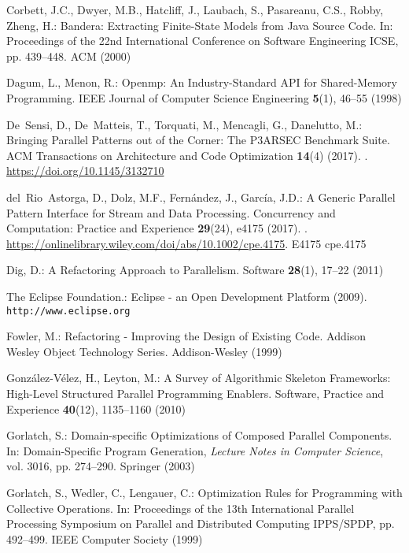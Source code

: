 \documentclass[smallextended]{svjour3}
\begin{document}
\begin{thebibliography}{10}
Corbett, J.C., Dwyer, M.B., Hatcliff, J., Laubach, S., Pasareanu, C.S., Robby,
  Zheng, H.: Bandera: Extracting Finite-State Models from Java Source Code.
\newblock In: {Proceedings of the 22nd International Conference on Software Engineering ICSE}, pp. 439--448. {ACM} (2000)

Dagum, L., Menon, R.: Openmp: An Industry-Standard API for Shared-Memory
  Programming.
\newblock IEEE Journal of Computer Science Engineering \textbf{5}(1), 46–55 (1998)

De~Sensi, D., De~Matteis, T., Torquati, M., Mencagli, G., Danelutto, M.:
  Bringing Parallel Patterns out of the Corner: The P3ARSEC Benchmark Suite.
\newblock ACM Transactions on Architecture and Code Optimization \textbf{14}(4) (2017).
\newblock {}.
\newblock \urlprefix\url{https://doi.org/10.1145/3132710}

del Rio Astorga, D., Dolz, M.F., Fernández, J., García, J.D.: A Generic
  Parallel Pattern Interface for Stream and Data Processing.
\newblock Concurrency and Computation: Practice and Experience \textbf{29}(24),
  e4175 (2017).
\newblock {}.
\newblock
  \urlprefix\url{https://onlinelibrary.wiley.com/doi/abs/10.1002/cpe.4175}.
\newblock E4175 cpe.4175

Dig, D.: A Refactoring Approach to Parallelism.
 Software \textbf{28}(1), 17--22 (2011)

The Eclipse Foundation.: {E}clipse - an {O}pen {D}evelopment {P}latform (2009).
\newblock \texttt{http://www.eclipse.org}

Fowler, M.: Refactoring - Improving the Design of Existing Code.
\newblock Addison Wesley Object Technology Series. Addison-Wesley (1999)

Gonz{\'{a}}lez{-}V{\'{e}}lez, H., Leyton, M.: A Survey of Algorithmic Skeleton
  Frameworks: High-Level Structured Parallel Programming Enablers.
\newblock Software, Practice and Experience \textbf{40}(12), 1135--1160 (2010)

Gorlatch, S.: Domain-specific Optimizations of Composed Parallel Components.
\newblock In: Domain-Specific Program Generation, \emph{Lecture Notes in
  Computer Science}, vol. 3016, pp. 274--290. Springer (2003)

Gorlatch, S., Wedler, C., Lengauer, C.: Optimization Rules for Programming with
  Collective Operations.
\newblock In: {Proceedings of the 13th International Parallel Processing Symposium on Parallel and Distributed Computing IPPS/SPDP}, pp. 492--499. {IEEE} Computer Society (1999)


\end{thebibliography}
\end{document}
